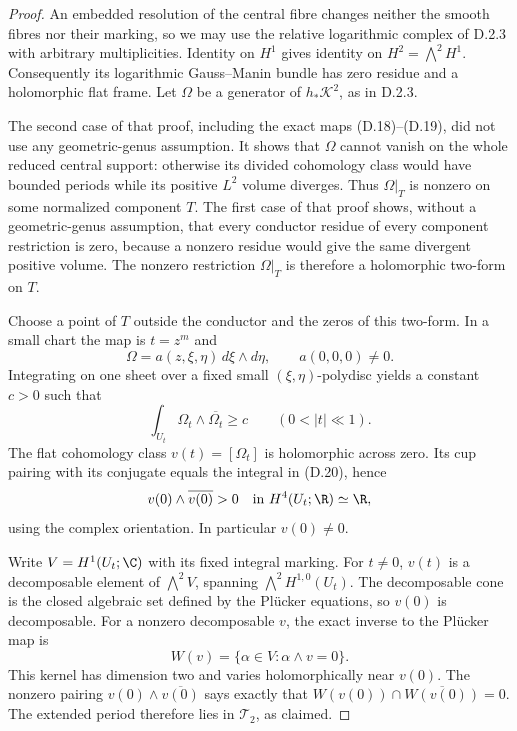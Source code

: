 \begin{proof}
An embedded resolution of the central fibre changes neither
the smooth fibres nor their marking, so we may use the relative
logarithmic complex of D.2.3 with arbitrary multiplicities.
Identity on $H^1$ gives identity on $H^2=\bigwedge^2H^1$.
Consequently its logarithmic Gauss--Manin bundle has zero
residue and a holomorphic flat frame. Let $\Omega$ be a
generator of $h_*\mathscr K^2$, as in D.2.3.

The second case of that proof, including the exact maps
(D.18)--(D.19), did not use any geometric-genus assumption.
It shows that $\Omega$ cannot vanish on the whole reduced
central support: otherwise its divided cohomology class would
have bounded periods while its positive $L^2$ volume diverges.
Thus $\Omega|_T$ is nonzero on some normalized component $T$.
The first case of that proof shows, without a geometric-genus
assumption, that every conductor residue of every component
restriction is zero, because a nonzero residue would give the
same divergent positive volume. The nonzero restriction
$\Omega|_T$ is therefore a holomorphic two-form on $T$.

Choose a point of $T$ outside the conductor and the zeros of
this two-form. In a small chart the map is $t=z^m$ and
\[
 \Omega=a(z,\xi,\eta)\,d\xi\wedge d\eta,
 \qquad a(0,0,0)\ne0.
\]
Integrating on one sheet over a fixed small
$(\xi,\eta)$-polydisc yields a constant $c>0$ such that
\[
 \int_{U_t}\Omega_t\wedge\overline{\Omega_t}\ge c
 \qquad(0<|t|\ll1).
\tag{D.20}
\]
The flat cohomology class $v(t)=[\Omega_t]$ is holomorphic
across zero. Its cup pairing with its conjugate equals the
integral in (D.20), hence
\[
 v(0)\wedge\overline{v(0)}>0
 \quad\hbox{in }H^4(U_t;\R)\simeq\R,
\]
using the complex orientation. In particular $v(0)\ne0$.

Write $V=H^1(U_t;\C)$ with its fixed integral marking.
For $t\ne0$, $v(t)$ is a decomposable element of
$\bigwedge^2V$, spanning $\bigwedge^2H^{1,0}(U_t)$.
The decomposable cone is the closed algebraic set defined by
the Pl\"ucker equations, so $v(0)$ is decomposable. For a
nonzero decomposable $v$, the exact inverse to the Pl\"ucker
map is
\[
 W(v)=\{\alpha\in V:\alpha\wedge v=0\}.
\]
This kernel has dimension two and varies holomorphically near
$v(0)$. The nonzero pairing
$v(0)\wedge\overline{v(0)}$ says exactly that
$W(v(0))\cap\overline{W(v(0))}=0$. The extended period
therefore lies in $\mathcal T_2$, as claimed.


\end{proof}
